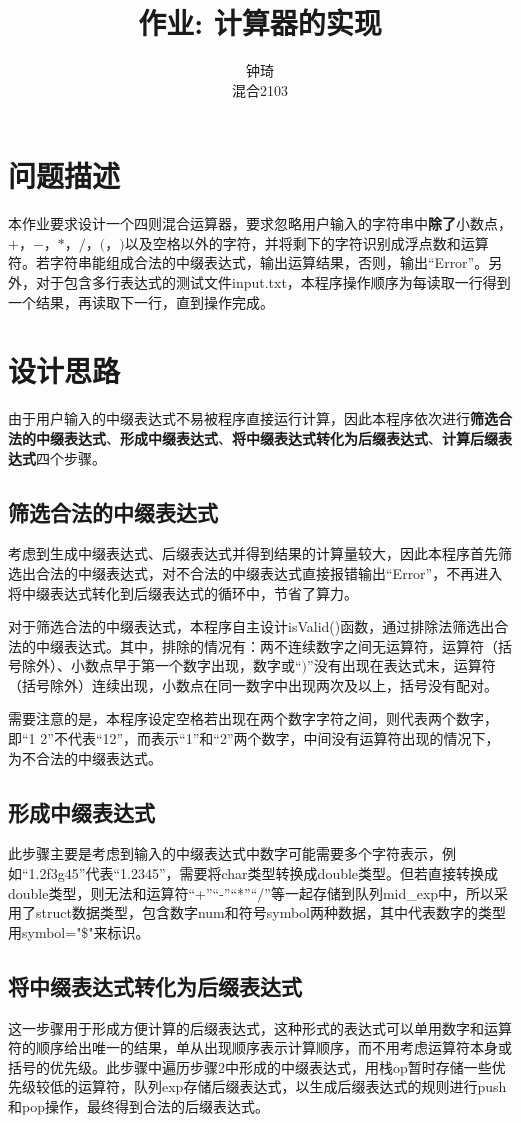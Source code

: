 \documentclass[UTF8]{ctexart}
\title{作业: 计算器的实现}
\author{钟琦 \\ 混合2103\quad3210103612}
\begin{document}
\maketitle
\section{问题描述}
本作业要求设计一个四则混合运算器，要求忽略用户输入的字符串中\textbf{除了}小数点，$+$，$-$，$*$，$/$，$($，$)$以及空格以外的字符，并将剩下的字符识别成浮点数和运算符。若字符串能组成合法的中缀表达式，输出运算结果，否则，输出“Error”。另外，对于包含多行表达式的测试文件input.txt，本程序操作顺序为每读取一行得到一个结果，再读取下一行，直到操作完成。
\section{设计思路}
由于用户输入的中缀表达式不易被程序直接运行计算，因此本程序依次进行\textbf{筛选合法的中缀表达式}、\textbf{形成中缀表达式}、\textbf{将中缀表达式转化为后缀表达式}、\textbf{计算后缀表达式}四个步骤。
\subsection{筛选合法的中缀表达式}
考虑到生成中缀表达式、后缀表达式并得到结果的计算量较大，因此本程序首先筛选出合法的中缀表达式，对不合法的中缀表达式直接报错输出“Error”，不再进入将中缀表达式转化到后缀表达式的循环中，节省了算力。\par
对于筛选合法的中缀表达式，本程序自主设计isValid()函数，通过排除法筛选出合法的中缀表达式。其中，排除的情况有：两不连续数字之间无运算符，运算符（括号除外）、小数点早于第一个数字出现，数字或“$)$”没有出现在表达式末，运算符（括号除外）连续出现，小数点在同一数字中出现两次及以上，括号没有配对。\par
需要注意的是，本程序设定空格若出现在两个数字字符之间，则代表两个数字，即“1 2”不代表“12”，而表示“1”和“2”两个数字，中间没有运算符出现的情况下，为不合法的中缀表达式。\par
\subsection{形成中缀表达式}
此步骤主要是考虑到输入的中缀表达式中数字可能需要多个字符表示，例如“1.2f3g45”代表“1.2345”，需要将char类型转换成double类型。但若直接转换成double类型，则无法和运算符“+”“-”“*”“/”等一起存储到队列mid\_exp中，所以采用了struct数据类型，包含数字num和符号symbol两种数据，其中代表数字的类型用symbol="\$"来标识。
\subsection{将中缀表达式转化为后缀表达式}
这一步骤用于形成方便计算的后缀表达式，这种形式的表达式可以单用数字和运算符的顺序给出唯一的结果，单从出现顺序表示计算顺序，而不用考虑运算符本身或括号的优先级。此步骤中遍历步骤2中形成的中缀表达式，用栈op暂时存储一些优先级较低的运算符，队列exp存储后缀表达式，以生成后缀表达式的规则进行push和pop操作，最终得到合法的后缀表达式。
\end{document}
